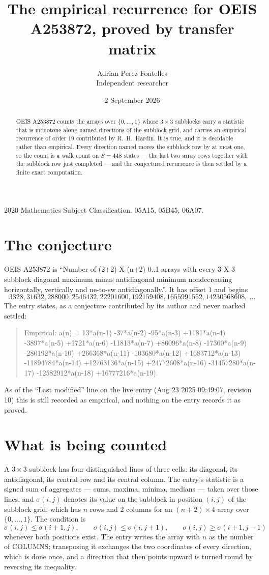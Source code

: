 \documentclass[11pt,a4paper]{article}
\title{The empirical recurrence for OEIS A253872, proved by transfer matrix}
\author{Adrian Perez Fontelles\\ \small Independent researcher}
\date{2 September 2026}
\theoremstyle{plain}
\theoremstyle{definition}
\begin{document}
\maketitle

\begin{abstract}
OEIS A253872 counts the arrays over $\{0,\dots,1\}$ whose $3\times3$ subblocks carry a
statistic that is monotone along named directions of the subblock grid, and carries an
empirical recurrence of order $19$ contributed by R.~H.~Hardin. It is true, and it is
decidable rather than empirical. Every direction named moves the subblock row by at most one,
so the count is a walk count on $S=448$ states --- the last two array rows together with the
subblock row just completed --- and the conjectured recurrence is then settled by a finite
exact computation.
\end{abstract}

\noindent\small 2020 Mathematics Subject Classification. 05A15, 05B45, 06A07.\normalsize

\section{The conjecture}

OEIS A253872 is ``Number of (2+2) X (n+2) 0..1 arrays with every 3 X 3 subblock diagonal maximum minus antidiagonal minimum nondecreasing horizontally, vertically and ne-to-sw antidiagonally.''. It has offset $1$ and begins
\[
3328, 31632, 288000, 2546432, 22201600, 192159408, 1655991552, 14230568608,\ \dots
\]
The entry states, as a conjecture contributed by its author and never marked settled:
\begin{quote}
Empirical: a(n) = 13*a(n-1) -37*a(n-2) -95*a(n-3) +1181*a(n-4) -3897*a(n-5) +1721*a(n-6) -11813*a(n-7) +86096*a(n-8) -17360*a(n-9) -280192*a(n-10) +266368*a(n-11) -103680*a(n-12) +1683712*a(n-13) -11894784*a(n-14) +12763136*a(n-15) +24772608*a(n-16) -31457280*a(n-17) -12582912*a(n-18) +16777216*a(n-19).
\end{quote}
As of the ``Last modified'' line on the live entry (Aug 23 2025 09:49:07, revision 10) this is still
recorded as empirical, and nothing on the entry records it as proved.

\section{What is being counted}

A $3\times3$ subblock has four distinguished lines of three cells: its diagonal, its
antidiagonal, its central row and its central column. The entry's statistic is a signed sum of
aggregates --- sums, maxima, minima, medians --- taken over those lines, and $\sigma(i,j)$
denotes its value on the subblock in position $(i,j)$ of the subblock grid, which has $n$ rows
and $2$ columns for an $(n+2)\times4$ array over $\{0,\dots,1\}$. The condition is
\[
\sigma(i,j)\le\sigma(i+1,j),\qquad \sigma(i,j)\le\sigma(i,j+1),\qquad \sigma(i,j)\ge\sigma(i+1,j-1)
\]
whenever both positions exist. The entry writes the array with $n$ as the number of COLUMNS; transposing it exchanges the two coordinates of every direction, which is done once, and a direction that then points upward is turned round by reversing its inequality.
\end{document}
